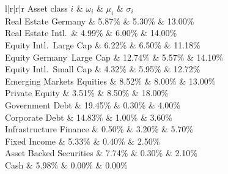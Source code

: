 \newpage






\tasksix

\begin{code}
    \begin{itabular}{l|r|r|r}
    \hline
        Asset class $i$ & 
        $\omega_i$ & 
        $\mu_i$ & 
        $\sigma_i$ \\
    \hline
        Real Estate Germany & 5.87\% & 5.30\% & 13.00\%\\
        Real Estate Intl.\ & 4.99\% & 6.00\% & 14.00\%\\
        Equity Intl.\ Large Cap & 6.22\% & 6.50\% & 11.18\%\\
        Equity Germany\ Large Cap & 12.74\% & 5.57\% & 14.10\%\\
        Equity Intl.\ Small Cap & 4.32\% & 5.95\% & 12.72\%\\
        Emerging Markets Equities & 8.52\% & 8.00\% & 13.00\%\\
        Private Equity  & 3.51\% & 8.50\% & 18.00\%\\
        Government Debt & 19.45\% & 0.30\% & 4.00\%\\
        Corporate Debt & 14.83\% & 1.00\% & 3.60\%\\
        Infrastructure Finance & 0.50\% & 3.20\% & 5.70\%\\
        Fixed Income & 5.33\% & 0.40\% & 2.50\%\\
        Asset Backed Securities & 7.74\% & 0.30\% & 2.10\%\\
        Cash & 5.98\% & 0.00\% & 0.00\% \\ 
    \hline
    \end{itabular}
\end{code}

\newpage






\taskseven


